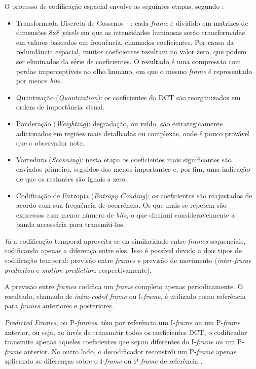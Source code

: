 O processo de codificação espacial envolve as seguintes etapas, segundo \cite{mpeg2ref}:
\begin{itemize}
    \item Transformada Discreta de Cossenos - : cada \emph{frame} é dividido em matrizes de dimensões 8x8 \emph{pixels} em que as intensidades luminosas serão transformadas em valores baseados em frequência, chamados coeficientes. Por causa da redundância espacial, muitos coeficientes resultam no valor zero, que podem ser eliminados da série de coeficientes. O resultado é uma compressão com perdas imperceptíveis ao olho humano, em que o mesmo \emph{frame} é representado por menos \emph{bits}.
    \item Quantização (\emph{Quantization}): os coeficientes da DCT são reorganizados em ordem de importância visual.
    \item Ponderação (\emph{Weighting}): degradação, ou ruído, são estrategicamente adicionados em regiões mais detalhadas ou complexas, onde é pouco provável que o observador note. 
    \item Varredura (\emph{Scanning}): nesta etapa os coeficientes mais significantes são enviados primeiro, seguidos dos menos importantes e, por fim, uma indicação de que os restantes são iguais a zero.
    \item Codificação de Entropia (\emph{Entropy Conding}): os coeficientes são reajustados de acordo com sua frequência de ocorrência. Os que mais se repetem são expressos com menor número de \emph{bits}, o que diminui consideravelmente a banda necessária para transmiti-los.
\end{itemize}

Já a codificação temporal aproveita-se da similaridade entre \emph{frames} sequenciais, codificando apenas a diferença entre eles. Isso é possível devido a dois tipos de codificação temporal: previsão entre \emph{frames} e previsão de movimento (\emph{inter-frame prediction} e \emph{motion prediction}, respectivamente).

A previsão entre \emph{frames} codifica um \emph{frame} completo apenas periodicamente. O resultado, chamado de \emph{intra-coded frame} ou I-\emph{frame}, é utilizado como referência para \emph{frames} anteriores e posteriores.

\emph{Predicted Frames}, ou P-\emph{frames}, têm por referência um I-\emph{frame} ou um P-\emph{frame} anterior, ou seja, ao invés de transmitir todos os coeficientes DCT, o codificador transmite apenas aqueles coeficientes que sejam diferentes do I-\emph{frame} ou um P-\emph{frame} anterior. No outro lado, o decodificador reconstrói um P-\emph{frame} apenas aplicando as diferenças sobre o I-\emph{frame} ou P-\emph{frame} de referência \cite{mpeg2ref}.

